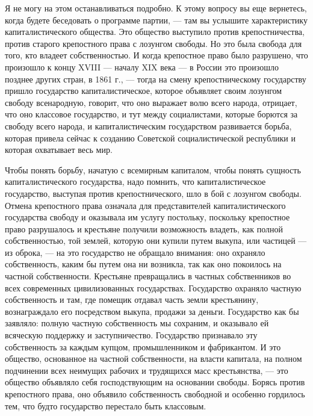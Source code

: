 \documentclass[12pt]{article}
\newcommand{\parnum}{(\arabic{parcount})}
\newcounter{parcount}
\newenvironment{parnumbers}{%
  \par%
  \everypar{\noindent \stepcounter{parcount}\marginpar[]{\parnum}}%
}{}
\begin{document}
\begin{parnumbers}
Я не могу на этом останавливаться подробно. К этому вопросу вы еще вернетесь, когда будете беседовать о программе партии, — там вы услышите характеристику капиталистического общества. Это общество выступило против крепостничества, против старого крепостного права с лозунгом свободы. Но это была свобода для того, кто владеет собственностью. И когда крепостное право было разрушено, что произошло к концу XVIII — началу XIX века — в России это произошло позднее других стран, в 1861 г., — тогда на смену крепостническому государству пришло государство капиталистическое, которое объявляет своим лозунгом свободу всенародную, говорит, что оно выражает волю всего народа, отрицает, что оно классовое государство, и тут между социалистами, которые борются за свободу всего народа, и капиталистическим государством развивается борьба, которая привела сейчас к созданию Советской социалистической республики и которая охватывает весь мир.

Чтобы понять борьбу, начатую с всемирным капиталом, чтобы понять сущность капиталистического государства, надо помнить, что капиталистическое государство, выступая против крепостнического, шло в бой с лозунгом свободы. Отмена крепостного права означала для представителей капиталистического государства свободу и оказывала им услугу постольку, поскольку крепостное право разрушалось и крестьяне получили возможность владеть, как полной собственностью, той землей, которую они купили путем выкупа, или частицей — из оброка, — на это государство не обращало внимания: оно охраняло собственность, каким бы путем она ни возникла, так как оно покоилось на частной собственности. Крестьяне превращались в частных собственников во всех современных цивилизованных государствах. Государство охраняло частную собственность и там, где помещик отдавал часть земли крестьянину, вознаграждало его посредством выкупа, продажи за деньги. Государство как бы заявляло: полную частную собственность мы сохраним, и оказывало ей всяческую поддержку и заступничество. Государство признавало эту собственность за каждым купцом, промышленником и фабрикантом. И это общество, основанное на частной собственности, на власти капитала, на полном подчинении всех неимущих рабочих и трудящихся масс крестьянства, — это общество объявляло себя господствующим на основании свободы. Борясь против крепостного права, оно объявило собственность свободной и особенно гордилось тем, что будто государство перестало быть классовым.


\end{parnumbers}
\end{document}
